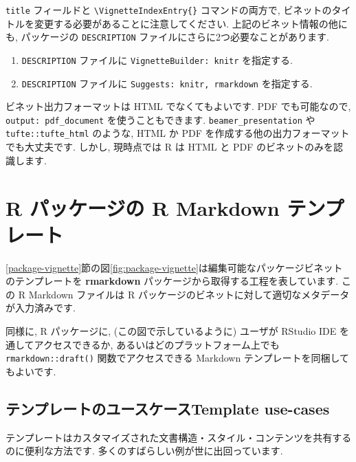 \documentclass[
  11pt,
]{bxjsreport}
\begin{document}
\texttt{title} フィールドと \texttt{\textbackslash{}VignetteIndexEntry\{\}} コマンドの両方で, ビネットのタイトルを変更する必要があることに注意してください. 上記のビネット情報の他にも, パッケージの \texttt{DESCRIPTION} ファイルにさらに2つ必要なことがあります.

\begin{enumerate}
\def\labelenumi{\arabic{enumi}.}
\item
  \texttt{DESCRIPTION} ファイルに \texttt{VignetteBuilder: knitr} を指定する.
\item
  \texttt{DESCRIPTION} ファイルに \texttt{Suggests: knitr, rmarkdown} を指定する.
\end{enumerate}

ビネット出力フォーマットは HTML でなくてもよいです. PDF でも可能なので, \texttt{output: pdf\_document} を使うこともできます. \texttt{beamer\_presentation} や \texttt{tufte::tufte\_html} のような, HTML か PDF を作成する他の出力フォーマットでも大丈夫です. しかし, 現時点では R は HTML と PDF のビネットのみを認識します.

\hypertarget{package-template}{%
\section{R パッケージの R Markdown テンプレート}\label{package-template}}

\ref{package-vignette}節の図\ref{fig:package-vignette}は編集可能なパッケージビネットのテンプレートを \textbf{rmarkdown} パッケージから取得する工程を表しています. この R Markdown ファイルは R パッケージのビネットに対して適切なメタデータが入力済みです.

同様に, R パッケージに, (この図で示しているように) ユーザが RStudio IDE を通してアクセスできるか, あるいはどのプラットフォーム上でも \texttt{rmarkdown::draft()} 関数でアクセスできる Markdown テンプレートを同梱してもよいです.

\hypertarget{ux30c6ux30f3ux30d7ux30ecux30fcux30c8ux306eux30e6ux30fcux30b9ux30b1ux30fcux30b9template-use-cases}{%
\subsection{テンプレートのユースケースTemplate use-cases}\label{ux30c6ux30f3ux30d7ux30ecux30fcux30c8ux306eux30e6ux30fcux30b9ux30b1ux30fcux30b9template-use-cases}}

テンプレートはカスタマイズされた文書構造・スタイル・コンテンツを共有するのに便利な方法です. 多くのすばらしい例が世に出回っています.
\end{document}

